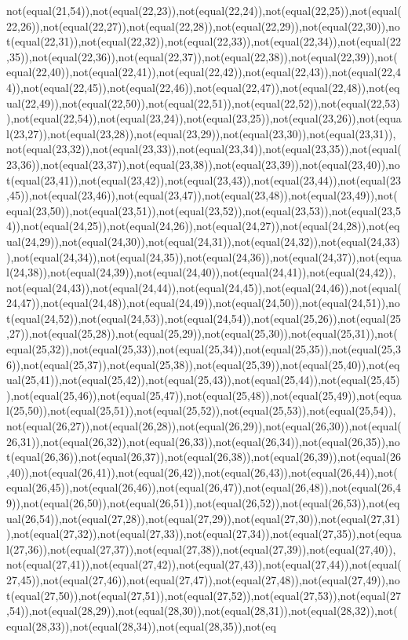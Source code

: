 not(equal(21,54)),not(equal(22,23)),not(equal(22,24)),not(equal(22,25)),not(equal(22,26)),not(equal(22,27)),not(equal(22,28)),not(equal(22,29)),not(equal(22,30)),not(equal(22,31)),not(equal(22,32)),not(equal(22,33)),not(equal(22,34)),not(equal(22,35)),not(equal(22,36)),not(equal(22,37)),not(equal(22,38)),not(equal(22,39)),not(equal(22,40)),not(equal(22,41)),not(equal(22,42)),not(equal(22,43)),not(equal(22,44)),not(equal(22,45)),not(equal(22,46)),not(equal(22,47)),not(equal(22,48)),not(equal(22,49)),not(equal(22,50)),not(equal(22,51)),not(equal(22,52)),not(equal(22,53)),not(equal(22,54)),not(equal(23,24)),not(equal(23,25)),not(equal(23,26)),not(equal(23,27)),not(equal(23,28)),not(equal(23,29)),not(equal(23,30)),not(equal(23,31)),not(equal(23,32)),not(equal(23,33)),not(equal(23,34)),not(equal(23,35)),not(equal(23,36)),not(equal(23,37)),not(equal(23,38)),not(equal(23,39)),not(equal(23,40)),not(equal(23,41)),not(equal(23,42)),not(equal(23,43)),not(equal(23,44)),not(equal(23,45)),not(equal(23,46)),not(equal(23,47)),not(equal(23,48)),not(equal(23,49)),not(equal(23,50)),not(equal(23,51)),not(equal(23,52)),not(equal(23,53)),not(equal(23,54)),not(equal(24,25)),not(equal(24,26)),not(equal(24,27)),not(equal(24,28)),not(equal(24,29)),not(equal(24,30)),not(equal(24,31)),not(equal(24,32)),not(equal(24,33)),not(equal(24,34)),not(equal(24,35)),not(equal(24,36)),not(equal(24,37)),not(equal(24,38)),not(equal(24,39)),not(equal(24,40)),not(equal(24,41)),not(equal(24,42)),not(equal(24,43)),not(equal(24,44)),not(equal(24,45)),not(equal(24,46)),not(equal(24,47)),not(equal(24,48)),not(equal(24,49)),not(equal(24,50)),not(equal(24,51)),not(equal(24,52)),not(equal(24,53)),not(equal(24,54)),not(equal(25,26)),not(equal(25,27)),not(equal(25,28)),not(equal(25,29)),not(equal(25,30)),not(equal(25,31)),not(equal(25,32)),not(equal(25,33)),not(equal(25,34)),not(equal(25,35)),not(equal(25,36)),not(equal(25,37)),not(equal(25,38)),not(equal(25,39)),not(equal(25,40)),not(equal(25,41)),not(equal(25,42)),not(equal(25,43)),not(equal(25,44)),not(equal(25,45)),not(equal(25,46)),not(equal(25,47)),not(equal(25,48)),not(equal(25,49)),not(equal(25,50)),not(equal(25,51)),not(equal(25,52)),not(equal(25,53)),not(equal(25,54)),not(equal(26,27)),not(equal(26,28)),not(equal(26,29)),not(equal(26,30)),not(equal(26,31)),not(equal(26,32)),not(equal(26,33)),not(equal(26,34)),not(equal(26,35)),not(equal(26,36)),not(equal(26,37)),not(equal(26,38)),not(equal(26,39)),not(equal(26,40)),not(equal(26,41)),not(equal(26,42)),not(equal(26,43)),not(equal(26,44)),not(equal(26,45)),not(equal(26,46)),not(equal(26,47)),not(equal(26,48)),not(equal(26,49)),not(equal(26,50)),not(equal(26,51)),not(equal(26,52)),not(equal(26,53)),not(equal(26,54)),not(equal(27,28)),not(equal(27,29)),not(equal(27,30)),not(equal(27,31)),not(equal(27,32)),not(equal(27,33)),not(equal(27,34)),not(equal(27,35)),not(equal(27,36)),not(equal(27,37)),not(equal(27,38)),not(equal(27,39)),not(equal(27,40)),not(equal(27,41)),not(equal(27,42)),not(equal(27,43)),not(equal(27,44)),not(equal(27,45)),not(equal(27,46)),not(equal(27,47)),not(equal(27,48)),not(equal(27,49)),not(equal(27,50)),not(equal(27,51)),not(equal(27,52)),not(equal(27,53)),not(equal(27,54)),not(equal(28,29)),not(equal(28,30)),not(equal(28,31)),not(equal(28,32)),not(equal(28,33)),not(equal(28,34)),not(equal(28,35)),not(eq